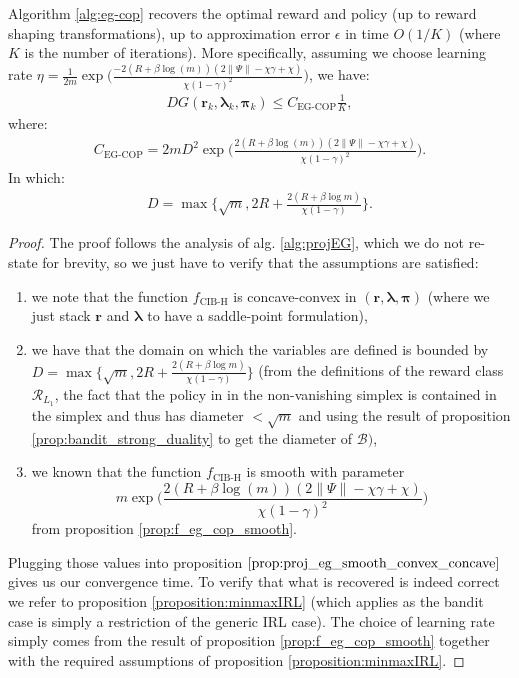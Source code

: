   \begin{theorem}
    \label{thm:EG_COP_convergence}
    Algorithm \ref{alg:eg-cop} recovers the optimal reward and policy (up to reward shaping transformations), up to approximation error $\epsilon$ in time $O(1/K)$ (where $K$ is the number of iterations). More specifically, assuming we choose learning rate $\eta = \frac{1}{2m}  \exp \Big(\frac{-2\left(R + \beta \log{\left(m \right)}\right) \left(2  \|\Psi\| - \chi \gamma + \chi\right)}{\chi \left(1- \gamma\right)^{2}} \Big)$, we have: 
    \begin{align*}
        DG(\bm{r}_k,\bm{\lambda}_k,\bm{\pi}_k) 
        \leq C_\text{EG-COP} \frac{1}{K},
    \end{align*}
    where:
    \begin{align*}
        C_\text{EG-COP} = 2 m D^2  \exp \Bigg(\frac{2\left(R + \beta \log{\left(m \right)}\right) \left(2  \|\Psi\| - \chi \gamma + \chi\right)}{\chi \left(1- \gamma\right)^{2}} \Bigg).
    \end{align*}
    In which:
    \begin{align*}
        D = \max\Big\{
            \sqrt{m},
            2R 
            +\frac{2(R +\beta \log m)}{\chi (1-\gamma)} 
            \Big\}.
    \end{align*}
  \end{theorem}
\begin{proof}
    The proof follows the analysis of alg. \ref{alg:projEG}, which we do not re-state for brevity, so we just have to verify that the assumptions are satisfied:
    \begin{enumerate}
        \item we note that the function $f_\text{CIB-H}$ is concave-convex in $(\bm{r},\bm{\lambda},\bm{\pi})$ (where we just stack $\bm{r}$ and $\bm{\lambda}$ to have a saddle-point formulation),
        \item we have that the domain on which the variables are defined is bounded by $D= \max\Big\{\sqrt{m},2R +\frac{2(R +\beta \log m)}{\chi (1-\gamma)} \Big\} $ (from the definitions of the reward class $\mathcal{R}_{L_1}$, the fact that the policy in in the non-vanishing simplex is contained in the simplex and thus has diameter $<\sqrt{m}$ and using the result of proposition \ref{prop:bandit_strong_duality} to get the diameter of $\mathcal{B})$,
        \item we known that the function $f_\text{CIB-H}$ is smooth with parameter \[m  \exp \Big(\frac{2\left(R + \beta \log{\left(m \right)}\right) \left(2  \|\Psi\| - \chi \gamma + \chi\right)}{\chi \left(1- \gamma\right)^{2}} \Big)\] from proposition \ref{prop:f_eg_cop_smooth}.
    \end{enumerate}
    Plugging those values into proposition $\ref{prop:proj_eg_smooth_convex_concave}$ gives us our convergence time. To verify that what is recovered is indeed correct we refer to proposition \ref{proposition:minmaxIRL} (which applies as the bandit case is simply a restriction of the generic IRL case). The choice of learning rate simply comes from the result of proposition \ref{prop:f_eg_cop_smooth} together with the required assumptions of proposition \ref{proposition:minmaxIRL}.
\end{proof}
